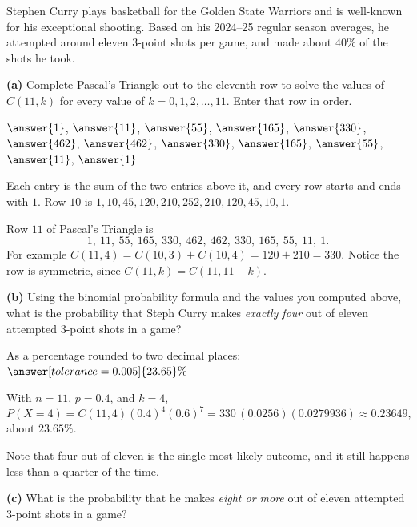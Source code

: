 \documentclass[12pt]{ximera}
\begin{document}
\begin{problem}
Stephen Curry plays basketball for the Golden State Warriors and is well-known for
his exceptional shooting. Based on his 2024--25 regular season averages, he attempted
around eleven 3-point shots per game, and made about $40\%$ of the shots he took.

\begin{prompt}
\textbf{(a)} Complete Pascal's Triangle out to the eleventh row to solve the values
of $C(11,k)$ for every value of $k=0,1,2,\ldots,11$. Enter that row in order.

$\answer{1}$, $\answer{11}$, $\answer{55}$, $\answer{165}$, $\answer{330}$,
$\answer{462}$, $\answer{462}$, $\answer{330}$, $\answer{165}$, $\answer{55}$,
$\answer{11}$, $\answer{1}$

\begin{hint}
Each entry is the sum of the two entries above it, and every row starts and ends with
$1$. Row $10$ is $1, 10, 45, 120, 210, 252, 210, 120, 45, 10, 1$.
\end{hint}

\begin{feedback}
Row $11$ of Pascal's Triangle is
\[
1,\ 11,\ 55,\ 165,\ 330,\ 462,\ 462,\ 330,\ 165,\ 55,\ 11,\ 1.
\]
For example $C(11,4)=C(10,3)+C(10,4)=120+210=330$. Notice the row is symmetric,
since $C(11,k)=C(11,11-k)$.
\end{feedback}
\end{prompt}

\begin{prompt}
\textbf{(b)} Using the binomial probability formula and the values you computed
above, what is the probability that Steph Curry makes \emph{exactly four} out of
eleven attempted 3-point shots in a game?

As a percentage rounded to two decimal places: $\answer[tolerance=0.005]{23.65}\%$

\begin{feedback}
With $n=11$, $p=0.4$, and $k=4$,
\[
P(X=4)=C(11,4)(0.4)^4(0.6)^7 = 330\,(0.0256)(0.0279936)\approx 0.23649,
\]
about $23.65\%$.

Note that four out of eleven is the single most likely outcome, and it still happens
less than a quarter of the time.
\end{feedback}
\end{prompt}

\begin{prompt}
\textbf{(c)} What is the probability that he makes \emph{eight or more} out of eleven
attempted 3-point shots in a game?


\end{prompt}
\end{problem}
\end{document}
